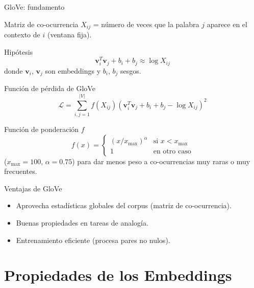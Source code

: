 \documentclass[aspectratio=169, 10pt, xcolor=table]{beamer}
\begin{document}
\begin{frame}{GloVe: fundamento}
    \begin{block}{Matriz de co-ocurrencia}
        $X_{ij}$ = número de veces que la palabra $j$ aparece en el contexto de $i$ (ventana fija).
    \end{block}
    \begin{block}{Hipótesis}
        \[
        \mathbf{v}_i^T \mathbf{v}_j + b_i + b_j \approx \log X_{ij}
        \]
        donde $\mathbf{v}_i$, $\mathbf{v}_j$ son embeddings y $b_i$, $b_j$ sesgos.
    \end{block}
\end{frame}

\begin{frame}{Función de pérdida de GloVe}
    \[
    \mathcal{L} = \sum_{i,j=1}^{|V|} f(X_{ij}) (\mathbf{v}_i^T \mathbf{v}_j + b_i + b_j - \log X_{ij})^2
    \]
    \begin{block}{Función de ponderación $f$}
        \[
        f(x) = \begin{cases}
            (x/x_{\max})^\alpha & \text{si } x < x_{\max} \\
            1 & \text{en otro caso}
        \end{cases}
        \]
        ($x_{\max}=100$, $\alpha=0.75$) para dar menos peso a co-ocurrencias muy raras o muy frecuentes.
    \end{block}
\end{frame}

\begin{frame}{Ventajas de GloVe}
    \begin{itemize}
        \item Aprovecha estadísticas globales del corpus (matriz de co-ocurrencia).
        \item Buenas propiedades en tareas de analogía.
        \item Entrenamiento eficiente (procesa pares no nulos).
    \end{itemize}
\end{frame}

\section{Propiedades de los Embeddings}
\end{document}
